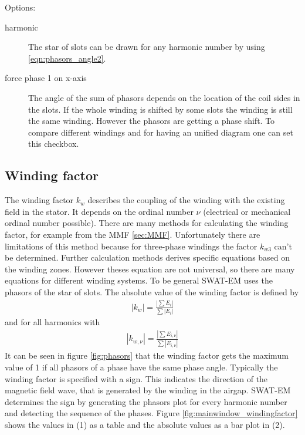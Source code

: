 \documentclass[]{scrreprt}
\begin{document}
%
Options:
\begin{description}
 \item[harmonic] The star of slots can be drawn for any harmonic number by using \eqref{eqn:phasors_angle2}.
 \item[force phase 1 on x-axis] The angle of the sum of phasors depends on the location of the coil sides
                                in the slots. If the whole winding is shifted by some slots the winding is
                                still the same winding. However the phasors are getting a phase shift. To
                                compare different windings and for having an unified diagram one can set
                                this checkbox.
\end{description}
%
%
\FloatBarrier
\subsection{Winding factor}
The winding factor $k_w$ describes the coupling of the winding with the existing field in the stator. It depends
on the ordinal number $\nu$ (electrical or mechanical ordinal number possible). There are many methods for 
calculating the winding factor, for example from the MMF \ref{sec:MMF}. Unfortunately there are limitations
of this method because for three-phase windings the factor $k_{w3}$ can't be determined. Further calculation
methods derives specific equations based on the winding zones. However theses equation are not universal, so
there are many equations for different winding systems. To be general SWAT-EM uses the phasors of the
star of slots. The absolute value of the winding factor is defined by
%
\begin{align}
|k_{w}| = \frac{|\sum{E_i}|}{ \sum{| E_{i} |} }
\end{align} 
%
and for all harmonics with
%
\begin{align}
|k_{w,\nu}| = \frac{|\sum{E_{i,\nu}}|}{ \sum{| E_{i,\nu} |} }
\end{align} 
%
It can be seen in figure \ref{fig:phasors} that the winding factor gets the maximum value of 1 if all
phasors of a phase have the same phase angle. Typically the winding factor is specified with a sign. This
indicates the direction of the magnetic field wave, that is generated by the winding in the airgap. 
SWAT-EM determines the sign by generating the phasors plot for every harmonic number and detecting the
sequence of the phases. Figure \ref{fig:mainwindow_windingfactor} shows the values in (1) as a table
and the absolute values as a bar plot in (2).
\end{document}
